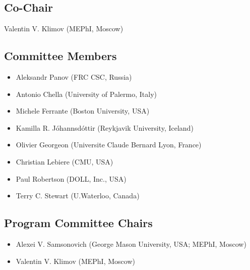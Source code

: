 \documentclass[10pt,fleqn,openany]{book} %
\begin{document}
\subsection{Co-Chair}
	Valentin V. Klimov (MEPhI, Moscow)

\subsection{Committee Members}
	\begin{itemize}
		\item Aleksandr Panov (FRC CSC, Russia)
		\item Antonio Chella (University of Palermo, Italy)
		\item Michele Ferrante (Boston University, USA)
		\item Kamilla R. Jóhannsdóttir (Reykjavik University, Iceland)
		\item Olivier Georgeon (Universite Claude Bernard Lyon, France)
		\item Christian Lebiere (CMU, USA)
		\item Paul Robertson (DOLL, Inc., USA)
		\item Terry C. Stewart (U.Waterloo, Canada)
	\end{itemize}
	
\subsection{Program Committee Chairs}
	\begin{itemize}
		\item Alexei V. Samsonovich (George Mason University, USA; MEPhI, Moscow)
		\item Valentin V. Klimov (MEPhI, Moscow)
	\end{itemize}
\end{document}
